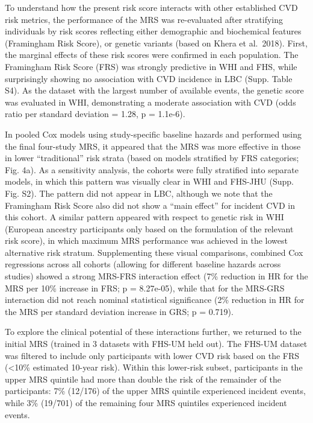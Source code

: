 \documentclass[]{article}
\begin{document}
To understand how the present risk score interacts with other
established CVD risk metrics, the performance of the MRS was
re-evaluated after stratifying individuals by risk scores reflecting
either demographic and biochemical features (Framingham Risk Score), or
genetic variants (based on Khera et al.~2018). First, the marginal
effects of these risk scores were confirmed in each population. The
Framingham Risk Score (FRS) was strongly predictive in WHI and FHS,
while surprisingly showing no association with CVD incidence in LBC
(Supp. Table S4). As the dataset with the largest number of available
events, the genetic score was evaluated in WHI, demonstrating a moderate
association with CVD (odds ratio per standard deviation = 1.28, p =
1.1e-6).

In pooled Cox models using study-specific baseline hazards and performed
using the final four-study MRS, it appeared that the MRS was more
effective in those in lower ``traditional'' risk strata (based on models
stratified by FRS categories; Fig. 4a). As a sensitivity analysis, the
cohorts were fully stratified into separate models, in which this
pattern was visually clear in WHI and FHS-JHU (Supp. Fig. S2). The
pattern did not appear in LBC, although we note that the Framingham Risk
Score also did not show a ``main effect'' for incident CVD in this
cohort. A similar pattern appeared with respect to genetic risk in WHI
(European ancestry participants only based on the formulation of the
relevant risk score), in which maximum MRS performance was achieved in
the lowest alternative risk stratum. Supplementing these visual
comparisons, combined Cox regressions across all cohorts (allowing for
different baseline hazards across studies) showed a strong MRS-FRS
interaction effect (7\% reduction in HR for the MRS per 10\% increase in
FRS; p = 8.27e-05), while that for the MRS-GRS interaction did not reach
nominal statistical significance (2\% reduction in HR for the MRS per
standard deviation increase in GRS; p = 0.719).

To explore the clinical potential of these interactions further, we
returned to the initial MRS (trained in 3 datasets with FHS-UM held
out). The FHS-UM dataset was filtered to include only participants with
lower CVD risk based on the FRS (\textless{}10\% estimated 10-year
risk). Within this lower-risk subset, participants in the upper MRS
quintile had more than double the risk of the remainder of the
participants: 7\% (12/176) of the upper MRS quintile experienced
incident events, while 3\% (19/701) of the remaining four MRS quintiles
experienced incident events.
\end{document}
